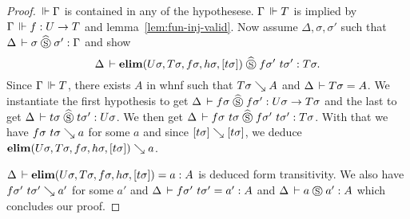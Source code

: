\documentclass[a4paper,english]{lipics-utf8x}
\begin{document}
  \begin{proof}
    $\,\Vdash \Gamma$ is contained in any of the hypothesese.
    $\Gamma \,\Vdash T$ is implied by $\Gamma \,\Vdash f : U \to T$ and
    lemma~\ref{lem:fun-inj-valid}.
    Now assume $\Delta, \sigma, \sigma'$ such that
    $\Delta \,\vdash \sigma \mathrel{\widehat{\mathrel{\circledS}}} \sigma' : \Gamma$ and
    show
    \[\Delta \,\vdash \operatorname{\mathbf{elim}}(U \sigma,T \sigma,f \sigma,h \sigma,[t \sigma]) \mathrel{\widehat{\mathrel{\circledS}}}
    f \sigma'\ t \sigma' : T \sigma.\]
    Since $\Gamma \,\Vdash T$, there exists $A$ in whnf such that $T \sigma \searrow A$
    and $\Delta \,\vdash T \sigma = A$.
    We instantiate the first hypothesis to get
    $\Delta \,\vdash f \sigma \mathrel{\widehat{\mathrel{\circledS}}} f \sigma' : U \sigma \to T \sigma$
    and the last to get
    $\Delta \,\vdash t \sigma \mathrel{\widehat{\mathrel{\circledS}}} t \sigma' : U \sigma$.
    We then get
    $\Delta \,\vdash f \sigma\ t \sigma \mathrel{\widehat{\mathrel{\circledS}}} f \sigma'\ t \sigma' : T \sigma$.
    With that we have $f \sigma\ t \sigma \searrow a$ for some $a$ and since
    $[t \sigma] \searrow [t \sigma]$, we deduce
    $\operatorname{\mathbf{elim}}(U \sigma,T \sigma,f \sigma,h \sigma,[t \sigma]) \searrow a$.

    \noindent %
    $\Delta \,\vdash \operatorname{\mathbf{elim}}(U \sigma,T \sigma,f \sigma,h \sigma,[t \sigma]) = a : A$
    is deduced form transitivity.
    We also have $f \sigma'\ t \sigma' \searrow a'$ for some $a'$ and
    $\Delta \,\vdash f \sigma'\ t \sigma' = a' : A$
    and $\Delta \,\vdash a \mathrel{\circledS} a' : A$ which concludes our proof.
  \end{proof}

  \begin{lemma}
    \leavevmode
    \begin{mathc}
    \end{mathc}
  \end{lemma}
\end{document}
